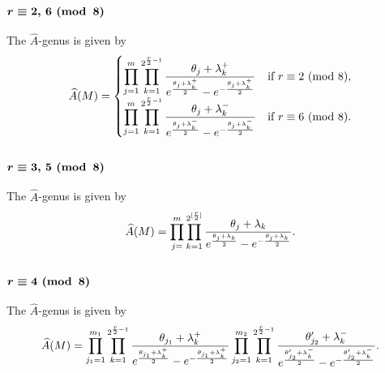 \documentclass[10pt,a4paper]{amsart}
\newcommand{\A}{\mbox{$\widehat A$}}
\numberwithin{equation}{section}
\begin{document}
\subsubsection[$r\equiv 2,\,6 \,\,{\rm (mod\,\,\,8)}$]{$\boldsymbol{r\equiv 2,\,6 \,\,{\rm (mod\,\,\,8)}}$}

The \A-genus is given by
\begin{gather*}
\A(M)
= \begin{cases}
\displaystyle \prod _{j=1}^{m}\prod_{k=1}^{2^{{r\over 2}-1}}{\theta_j + \lambda_k^+\over e^{\theta_j + \lambda_k^+\over 2}
-e^{-{\theta_j + \lambda_k^+\over 2}}} & \mbox{if $r\equiv 2$ (mod 8)},\\
\displaystyle \prod_{j=1}^{m}\prod_{k=1}^{2^{{r\over 2}-1}}{\theta_j + \lambda_k^-\over e^{\theta_j + \lambda_k^-\over 2}
-e^{-{\theta_j + \lambda_k^-\over 2}}} & \mbox{if $r\equiv 6$ (mod 8)}.
\end{cases}
\end{gather*}

\subsubsection[$r\equiv3,\,5 \,\,{\rm (mod\,\,\,8)}$]{$\boldsymbol{r\equiv3,\,5 \,\,{\rm (mod\,\,\,8)}}$}

The \A-genus is given by
\begin{gather*}
\A(M) =\prod_{j=}^{m}\prod_{k=1}^{2^{[{r\over 2}]}}{\theta_j + \lambda_k\over e^{\theta_j + \lambda_k\over 2}
-e^{-{\theta_j + \lambda_k\over 2}}}.
\end{gather*}

\subsubsection[$r\equiv 4 \,\,{\rm (mod\,\,\,8)}$]{$\boldsymbol{r\equiv 4 \,\,{\rm (mod\,\,\,8)}}$}

The \A-genus is given by
\begin{gather*}
\A(M)=\prod_{j_1=1}^{m_1}\prod_{k=1}^{2^{{r\over 2}-1}}{\theta_{j_1} + \lambda_k^+\over e^{\theta_{j_1} + \lambda_k^+\over 2}
-e^{-{\theta_{j_1} + \lambda_k^+\over 2}}}
\prod_{j_2=1}^{m_2}\prod_{k=1}^{2^{{r\over 2}-1}}{\theta_{j_2}' + \lambda_{k}^-\over e^{\theta_{j_2}'
+ \lambda_{k}^-\over 2}-e^{-{\theta_{j_2}' + \lambda_{k}^-\over 2}}}.
\end{gather*}
\end{document}
